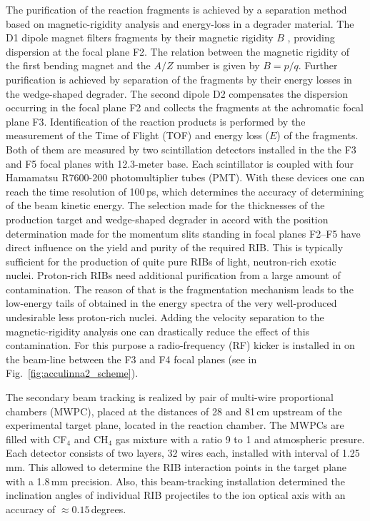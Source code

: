 The purification of the reaction fragments is achieved by a separation method based on magnetic-rigidity analysis and energy-loss in a degrader material. 
The D1 dipole magnet filters fragments by their magnetic rigidity $B$ , providing dispersion at the focal plane F2. 
The relation between the magnetic rigidity of the first bending magnet and the $A/Z$ number is given by $B=p/q$. 
Further purification is achieved by separation of the fragments by their energy losses in the wedge-shaped degrader. 
The second dipole D2 compensates the dispersion occurring in the focal plane F2 and collects the fragments at the achromatic focal plane F3. 
Identification of the reaction products is performed by the measurement of the Time of Flight (TOF) and energy
loss ($E$) of the fragments.
Both of them are measured by two scintillation detectors installed in the the F3 and F5 focal planes with 12.3-meter base. 
Each scintillator is coupled with four Hamamatsu R7600-200 photomultiplier tubes (PMT). 
With these devices one can reach the time resolution of 100\,ps, which determines the accuracy of determining of the beam kinetic energy.
The selection made for the thicknesses of the production target and wedge-shaped degrader in accord with the position determination made for the momentum slits standing in focal planes F2–F5 have direct influence on the yield and purity of the required RIB.
This is typically sufficient for the production of quite pure RIBs of light, neutron-rich exotic nuclei. Proton-rich RIBs need additional purification from a large amount of contamination. 
The reason of that is the fragmentation mechanism leads to the low-energy tails of obtained in the energy spectra of the very well-produced undesirable less proton-rich nuclei. 
Adding the velocity separation to the magnetic-rigidity analysis one can drastically reduce the effect of this contamination. 
For this purpose a radio-frequency (RF) kicker is installed in on the beam-line between the F3 and F4 focal planes (see in Fig.\ \ref{fig:acculinna2_scheme}). 

The secondary beam tracking is realized by pair of multi-wire proportional chambers (MWPC), placed at the distances of 28 and 81\,cm upstream of the experimental target plane, located in the reaction chamber.
The MWPCs are filled with CF$_{4}$ and CH$_{4}$ gas mixture with a ratio 9 to 1 and atmospheric presure.
Each detector consists of two layers, 32 wires each, installed with interval of 1.25\,mm. 
This allowed to determine the RIB interaction points in the target plane with a 1.8\,mm  precision.
Also, this beam-tracking installation determined the inclination angles of individual RIB projectiles to the ion optical axis with an accuracy of $\approx 0.15 $\,degrees.


